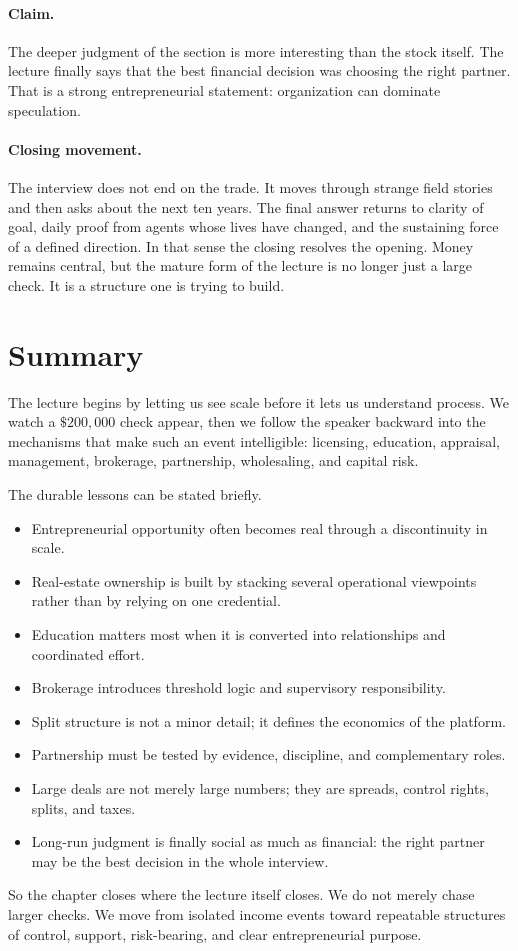 \paragraph{Claim.}
The deeper judgment of the section is more interesting than the stock itself. The lecture finally says that the best financial decision was choosing the right partner. That is a strong entrepreneurial statement: organization can dominate speculation.

\paragraph{Closing movement.}
The interview does not end on the trade. It moves through strange field stories and then asks about the next ten years. The final answer returns to clarity of goal, daily proof from agents whose lives have changed, and the sustaining force of a defined direction. In that sense the closing resolves the opening. Money remains central, but the mature form of the lecture is no longer just a large check. It is a structure one is trying to build.

\section{Summary}

The lecture begins by letting us see scale before it lets us understand process. We watch a \(\$200{,}000\) check appear, then we follow the speaker backward into the mechanisms that make such an event intelligible: licensing, education, appraisal, management, brokerage, partnership, wholesaling, and capital risk.

The durable lessons can be stated briefly.

\begin{itemize}
\item Entrepreneurial opportunity often becomes real through a discontinuity in scale.
\item Real-estate ownership is built by stacking several operational viewpoints rather than by relying on one credential.
\item Education matters most when it is converted into relationships and coordinated effort.
\item Brokerage introduces threshold logic and supervisory responsibility.
\item Split structure is not a minor detail; it defines the economics of the platform.
\item Partnership must be tested by evidence, discipline, and complementary roles.
\item Large deals are not merely large numbers; they are spreads, control rights, splits, and taxes.
\item Long-run judgment is finally social as much as financial: the right partner may be the best decision in the whole interview.
\end{itemize}

So the chapter closes where the lecture itself closes. We do not merely chase larger checks. We move from isolated income events toward repeatable structures of control, support, risk-bearing, and clear entrepreneurial purpose.